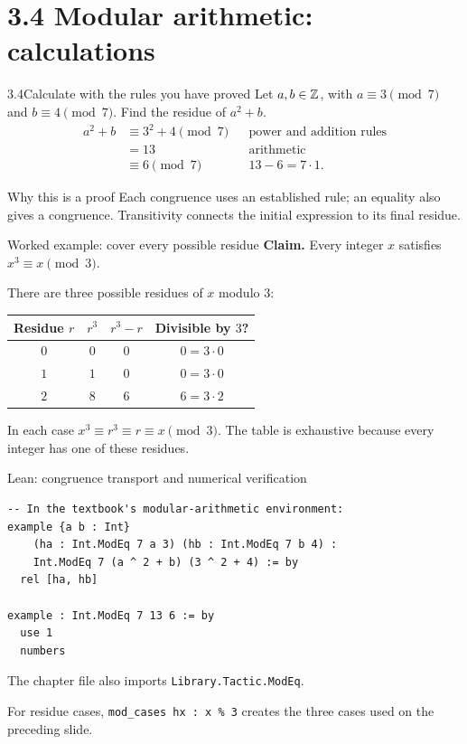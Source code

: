 \section{3.4 Modular arithmetic: calculations}
\begin{frame}{3.4\quad Calculate with the rules you have proved}
Let $a,b\in\mathbb{Z}$, with $a\equiv3\pmod7$ and $b\equiv4\pmod7$.
Find the residue of $a^2+b$.
\[
\begin{aligned}
a^2+b&\equiv3^2+4\pmod7&&\text{power and addition rules}\\
     &=13&&\text{arithmetic}\\
     &\equiv6\pmod7&&13-6=7\cdot1.
\end{aligned}
\]
\begin{block}{Why this is a proof}
Each congruence uses an established rule; an equality also gives a congruence.
Transitivity connects the initial expression to its final residue.
\end{block}
\end{frame}

\begin{frame}{Worked example: cover every possible residue}
\textbf{Claim.} Every integer $x$ satisfies $x^3\equiv x\pmod3$.

There are three possible residues of $x$ modulo $3$:
\begin{center}
\begin{tabular}{cccc}
\toprule
Residue $r$ & $r^3$ & $r^3-r$ & Divisible by $3$? \\
\midrule
$0$ & $0$ & $0$ & $0=3\cdot0$ \\
$1$ & $1$ & $0$ & $0=3\cdot0$ \\
$2$ & $8$ & $6$ & $6=3\cdot2$ \\
\bottomrule
\end{tabular}
\end{center}
In each case $x^3\equiv r^3\equiv r\equiv x\pmod3$.
The table is exhaustive because every integer has one of these residues.
\end{frame}

\begin{frame}[fragile]{Lean: congruence transport and numerical verification}
\begin{lstlisting}
-- In the textbook's modular-arithmetic environment:
example {a b : Int}
    (ha : Int.ModEq 7 a 3) (hb : Int.ModEq 7 b 4) :
    Int.ModEq 7 (a ^ 2 + b) (3 ^ 2 + 4) := by
  rel [ha, hb]

example : Int.ModEq 7 13 6 := by
  use 1
  numbers
\end{lstlisting}
The chapter file also imports \texttt{Library.Tactic.ModEq}.

For residue cases, \texttt{mod\_cases hx : x \% 3} creates the three cases used on the preceding slide.
\end{frame}

